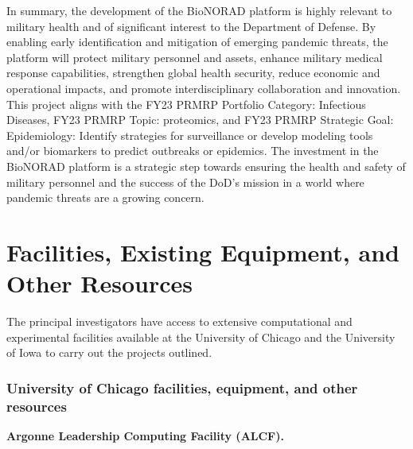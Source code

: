 \documentclass[onecolumn, compsoc,12pt]{IEEEtran}
\begin{document}
In summary, the development of the BioNORAD platform is highly relevant to military health and of significant interest to the Department of Defense. By enabling early identification and mitigation of emerging pandemic threats, the platform will protect military personnel and assets, enhance military medical response capabilities, strengthen global health security, reduce economic and operational impacts, and promote interdisciplinary collaboration and innovation. This project aligns with the FY23 PRMRP Portfolio Category: Infectious Diseases, FY23 PRMRP Topic: proteomics, and FY23 PRMRP Strategic Goal: Epidemiology: Identify strategies for surveillance or develop modeling tools and/or biomarkers to predict outbreaks or epidemics. The investment in the BioNORAD platform is a strategic step towards ensuring the health and safety of military personnel and the success of the DoD's mission in a world where pandemic threats are a growing concern.


\clearpage
{}
\section*{Facilities, Existing Equipment, and Other Resources}

% 
% 



The principal investigators have access to extensive computational and experimental  facilities available at the University of Chicago and the University of Iowa to carry out the projects outlined.





\subsubsection*{University of Chicago facilities, equipment, and other resources}

\textbf{Argonne Leadership Computing Facility (ALCF).}
\end{document}
